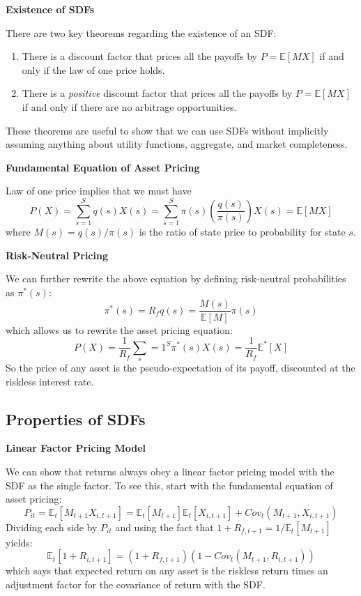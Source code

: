 \documentclass[
]{book}
\providecommand{\tightlist}{%
  \setlength{\itemsep}{0pt}\setlength{\parskip}{0pt}}
\begin{document}
\textbf{Existence of SDFs}

There are two key theorems regarding the existence of an SDF:

\begin{enumerate}
\def\labelenumi{\arabic{enumi}.}
\tightlist
\item
  There is a discount factor that prices all the payoffs by \(P=\mathbb{E}[MX]\) if and only if the law of one price holds.
\item
  There is a \emph{positive} discount factor that prices all the payoffs by \(P = \mathbb{E}[MX]\) if and only if there are no arbitrage opportunities.
\end{enumerate}

These theorems are useful to show that we can use SDFs without implicitly assuming anything about utility functions, aggregate, and market completeness.

\textbf{Fundamental Equation of Asset Pricing}

Law of one price implies that we must have
\[
P(X) = \sum_{s=1}^S q(s)X(s) = \sum_{s=1}^S \pi(s)\left(\frac{q(s)}{\pi(s)}\right)X(s) = \mathbb{E}[MX]
\]
where \(M(s) = q(s) / \pi(s)\) is the ratio of state price to probability for state \(s\).

\textbf{Risk-Neutral Pricing}

We can further rewrite the above equation by defining risk-neutral probabilities as \(\pi^*(s)\):
\[
\pi^*(s) = R_f q(s) =\frac{M(s)}{\mathbb{E}[M]} \pi(s)
\]
which allows us to rewrite the asset pricing equation:
\[
P(X) = \frac{1}{R_f} \sum_s=1^S \pi^*(s) X(s) = \frac{1}{R_f} \mathbb{E}^*[X]
\]
So the price of any asset is the pseudo-expectation of its payoff, discounted at the riskless interest rate.

\hypertarget{properties-of-sdfs}{%
\subsection{Properties of SDFs}\label{properties-of-sdfs}}

\textbf{Linear Factor Pricing Model}

We can show that returns always obey a linear factor pricing model with the SDF as the single factor. To see this, start with the fundamental equation of asset pricing:
\[
P_{it} = \mathbb{E}_t[M_{t+1}X_{i,t+1}] = \mathbb{E}_t[M_{t+1}]\mathbb{E}_t[X_{i,t+1}] + Cov_t(M_{t+1}, X_{i,t+1})
\]
Dividing each side by \(P_{it}\) and using the fact that \(1+R_{f,t+1} = 1 / \mathbb{E}_t[M_{t+1}]\) yields:
\[
\mathbb{E}_t[1+R_{i,t+1}] = (1 + R_{f,t+1})(1 - Cov_t(M_{t+1}, R_{i,t+1}))
\]
which says that expected return on any asset is the riskless return times an adjustment factor for the covariance of return with the SDF.
\end{document}
